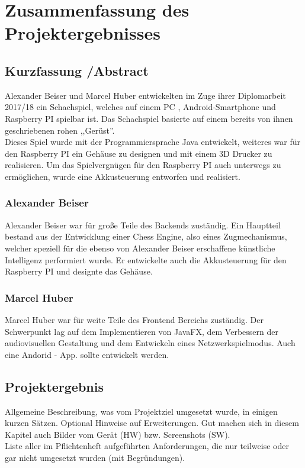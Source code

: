 \documentclass[12pt,a4paper]{article}
\newcommand{\yhbu}[0]{\color{ydkbu}}	%
\begin{document}
{%
\newpage
\section{Zusammenfassung des Projektergebnisses}
 \subsection{Kurzfassung /Abstract}
 
	Alexander Beiser und Marcel Huber entwickelten im Zuge ihrer Diplomarbeit 2017/18 ein Schachspiel, welches auf einem \ac{PC} , Android-Smartphone und Raspberry PI spielbar ist. Das Schachspiel basierte auf einem bereits von ihnen geschriebenen rohen ,,Gerüst''. \\
	Dieses Spiel wurde mit der Programmiersprache Java entwickelt, weiteres war für den Raspberry PI ein Gehäuse zu designen und mit einem 3D Drucker zu realisieren. Um das Spielvergnügen für den Raspberry PI auch unterwegs zu ermöglichen, wurde eine Akkusteuerung entworfen und realisiert. \\
	\subsubsection{Alexander Beiser}
	Alexander Beiser war für große Teile des Backends zuständig. Ein Hauptteil bestand aus der Entwicklung einer Chess Engine, also eines Zugmechanismus, welcher speziell für die ebenso von Alexander Beiser erschaffene künstliche Intelligenz performiert wurde. Er entwickelte auch die Akkusteuerung für den Raspberry PI und designte das Gehäuse.
	
	\subsubsection{Marcel Huber}
	Marcel Huber war für weite Teile des Frontend Bereichs zuständig. Der Schwerpunkt lag auf dem Implementieren von JavaFX, dem Verbessern der audiovisuellen Gestaltung und dem Entwickeln eines Netzwerkspielmodus. Auch eine Andorid - \ac{App.} sollte entwickelt werden.
 
	\vfill
	\newpage	
	
 \subsection{Projektergebnis}
	{\yhbu
	Allgemeine Beschreibung, was vom Projektziel umgesetzt wurde, in einigen kurzen Sätzen.
	Optional Hinweise auf Erweiterungen.
	Gut machen sich in diesem Kapitel auch Bilder vom Gerät (HW) bzw. Screenshots (SW).
	\\[1mm]
	Liste aller im Pflichtenheft aufgeführten Anforderungen,
	die nur teilweise oder gar nicht umgesetzt wurden (mit Begründungen).
	}












}
\end{document}

